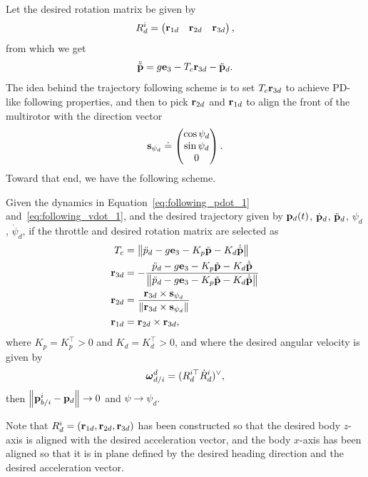 Let the desired rotation matrix be given by
\[
R_d^i = \begin{pmatrix} \mathbf{r}_{1d} & \mathbf{r}_{2d} & \mathbf{r}_{3d} \end{pmatrix},
\]
from which we get
\[
\ddot{\tilde{\mathbf{p}}} = g \mathbf{e}_3 - T_c\mathbf{r}_{3d} - \ddot{\mathbf{p}}_d.
\]
The idea behind the trajectory following scheme is to set $T_c\mathbf{r}_{3d}$ to achieve PD-like following properties, and then to pick $\mathbf{r}_{2d}$ and $\mathbf{r}_{1d}$ to align the front of the multirotor with the direction vector
\[
\mathbf{s}_{\psi_d} \doteq \begin{pmatrix} \cos\psi_d \\ \sin\psi_d \\  0 \end{pmatrix}.
\]
Toward that end, we have the following scheme.
\begin{theorem}
Given the dynamics in Equation~\eqref{eq:following_pdot_1} and~\eqref{eq:following_vdot_1}, and the desired trajectory given by $\mathbf{p}_d(t)$, $\dot{\mathbf{p}}_d$, $\ddot{\mathbf{p}}_d$, $\psi_d$, $\dot{\psi}_d$, if the throttle and desired rotation matrix are selected as
\begin{align}
T_c &= \norm{\ddot{p}_d - g\ebf_3 - K_p \tilde{\pbf} - K_d\dot{\tilde{\pbf}}} \label{eq:cascaded_attitude_T_c} \\
\rbf_{3d} &= -\frac{\ddot{p}_d - g\ebf_3 - K_p \tilde{\pbf} - K_d\dot{\tilde{\pbf}}}{\norm{\ddot{p}_d - g\ebf_3 - K_p \tilde{\pbf} - K_d\dot{\tilde{\pbf}}}} \label{eq:cascaded_attitude_r_3} \\
\rbf_{2d} &= \frac{\rbf_{3d} \times \sbf_{\psi_d}}{\norm{\rbf_{3d} \times \sbf_{\psi_d}}} \label{eq:cascaded_attitude_r_2}\\
\rbf_{1d} &= \rbf_{2d} \times \rbf_{3d},\label{eq:cascaded_attitude_r_1}
\end{align}
where $K_p=K_p^\top > 0$ and $K_d=K_d^\top > 0$, and where the desired angular velocity is given by
\[
\boldsymbol{\omega}_{d/i}^d = (R_d^{i\top}\dot{R}_d^{i})^\vee,
\]
then $\left\|\mathbf{p}_{b/i}^i - \mathbf{p}_d\right\| \to 0$ and $\psi \to \psi_d$.
\end{theorem}
Note that $R_d^i = (\mathbf{r}_{1d}, \mathbf{r}_{2d}, \mathbf{r}_{3d})$ has been constructed so that the desired body $z$-axis is aligned with the desired acceleration vector, and the body $x$-axis has been aligned so that it is in plane defined by the desired heading direction and the desired acceleration vector.

